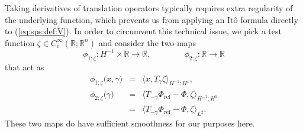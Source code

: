 \documentclass[10pt]{articleHJ}
\newcommand{\Real}{\mathbb{R}}							%
\newcommand{\sref}[1]{(\ref{#1})}                       %
\numberwithin{equation}{section}
\begin{document}
Taking derivatives of translation operators typically requires extra regularity of the underlying function,
which prevents us from applying an It\^o formula directly to \sref{eq:sps:def:V}.
In order to circumvent this technical issue,
we pick a test function $\zeta \in C_c^\infty(\Real;\Real^n)$
and consider the two maps
\begin{equation}
\phi_{1;\zeta}: H^{-1} \times \Real \to \Real,
\qquad
\qquad
\phi_{2;\zeta}:  \Real \to \Real
\end{equation}
that act as
\begin{equation}
\begin{array}{lcl}
\phi_{1;\zeta}\big( x , \gamma \big)
  & = &
   \langle x, T_{\gamma} \zeta
       \rangle_{H^{-1} ; H^1 },
\\[0.2cm]
%
\phi_{2;\zeta}\big( \gamma \big)
 & = &
   \langle T_{-\gamma} \Phi_{\mathrm{ref}} - \Phi , \zeta
       \rangle_{H^{-1} ; H^1 }
\\[0.2cm]
 & = &
     \langle T_{-\gamma} \Phi_{\mathrm{ref}} - \Phi , \zeta
       \rangle_{L^2}.
\end{array}
\end{equation}
These two maps do have sufficient smoothness for our purposes here.
\end{document}
